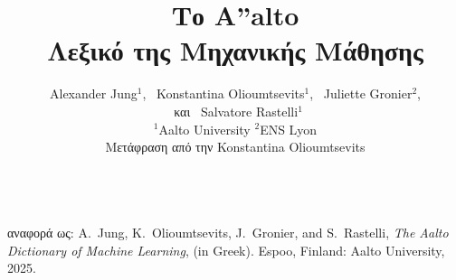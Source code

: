 \documentclass[journal,12pt,onecolumn]{article}
\begin{document}


\title {\vspace*{8mm}
	{\huge {\bf \foreignlanguage{greek}{Το} {\fontsize{40}{48}\selectfont \textbf{\textsf{A\hspace*{-2mm}''}}}\hspace*{-4mm}alto \\ \foreignlanguage{greek}{Λεξικό της Μηχανικής Μάθησης}}}  \\[-5mm] 
}


\author{\hspace{-2mm}Alexander Jung${}^{1}$, \ Konstantina Olioumtsevits${}^{1}$, \ Juliette Gronier${}^{2}$, \\[-2mm]
	\ \foreignlanguage{greek}{και} \ Salvatore Rastelli${}^{1}$ \\[-2mm]
	${}^{1}$Aalto University \quad ${}^{2}$ENS Lyon \\
\hspace{-2mm}\foreignlanguage{greek}{Μετάφραση από την} Konstantina Olioumtsevits \\[-2mm]
}

\maketitle
	\begin{center}
		\\[10mm]
{\large	\foreignlanguage{greek}{αναφορά ως}: A.\ Jung, K.\ Olioumtsevits, J.\ Gronier, and S.\ Rastelli, \textit{The Aalto Dictionary of Machine Learning}, (in Greek). Espoo, Finland: Aalto University, 2025.}
\end{center}

\newpage 
{}\
\end{document}
